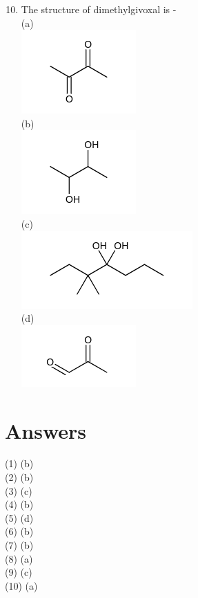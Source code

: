 \documentclass[10pt]{article}
\begin{document}
\begin{enumerate}
  \setcounter{enumi}{9}
  \item The structure of dimethylgivoxal is -\\
(a)\\
\includegraphics{smile-3a19eb0a1fcacd3332d9eaff75128df0e9c3f2b7}\\
(b)\\
\includegraphics{smile-ffc824c32b64f06894263da01bfe8e75bd8cfa51}\\
(c)\\
\includegraphics{smile-c41d99c0d1bca8c655fd70cd2227ba1276bc7eb1}\\
(d)\\
\includegraphics{smile-83340d003c434b9ea29a45c1a5693e14f144b25c}
\end{enumerate}

\section*{Answers}
(1) (b)\\
(2) (b)\\
(3) (c)\\
(4) (b)\\
(5) (d)\\
(6) (b)\\
(7) (b)\\
(8) (a)\\
(9) (c)\\
(10) (a)
\end{document}
